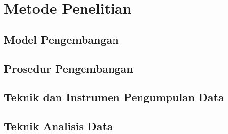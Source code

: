 \chapter{Metode Penelitian}
\section{Model Pengembangan}
\section{Prosedur Pengembangan}
\section{Teknik dan Instrumen Pengumpulan Data}
\section{Teknik Analisis Data}
